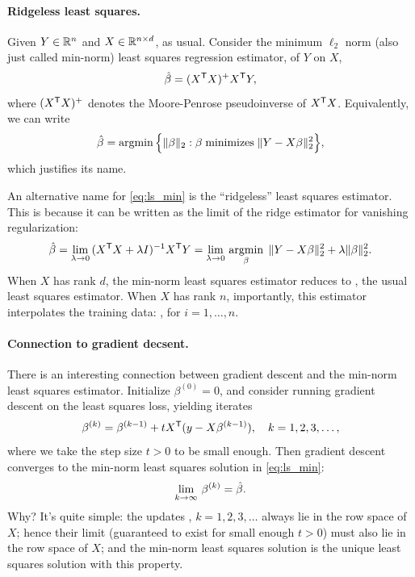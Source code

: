 \documentclass{article}
\begin{document}
\paragraph{Ridgeless least squares.}

Given $Y \in \mathbb{R}^n$ and $X \in \mathbb{R}^{n \times d}$, as usual. Consider the minimum
$\ell_2$ norm (also just called min-norm) least squares regression estimator, of
$Y$ on $X$, 
\begin{equation}
\label{eq:ls_min}
\hat{\beta} = (X^{\mathsf{T}} X)^+ X^{\mathsf{T}} Y,
\end{equation}
where $(X^{\mathsf{T}} X)^+$ denotes the Moore-Penrose pseudoinverse of $X^{\mathsf{T}} X$.
Equivalently, we can write 
\[
\hat{\beta} = \mathop{\mathrm{argmin}} \Big\{ \|\beta\|_2 : \beta \; \text{minimizes} \; \|Y - X
\beta\|_2^2 \Big\},   
\]
which justifies its name.  

An alternative name for \eqref{eq:ls_min} is the ``ridgeless'' least squares
estimator. This is because it can be written as the limit of the ridge estimator
for vanishing regularization:  
\[
\hat{\beta} = \lim_{\lambda \to 0} \, (X^{\mathsf{T}} X + \lambda I)^{-1} X^{\mathsf{T}} Y =   
\lim_{\lambda \to 0} \, \mathop{\mathrm{argmin}}_\beta \; \|Y - X\beta\|_2^2 + \lambda 
\|\beta\|_2^2.   
\]
When $X$ has rank $d$, the min-norm least squares estimator reduces to
, the usual least squares estimator.
When $X$ has rank $n$, importantly, this estimator interpolates the training
data: , for $i=1,\dots,n$.  

\paragraph{Connection to gradient decsent.}

There is an interesting connection between gradient descent and the min-norm
least squares estimator. Initialize $\beta^{(0)} = 0$, and consider running
gradient descent on the least squares loss, yielding iterates
\[
\beta^{(k)} = \beta^{(k-1)} + t X^{\mathsf{T}} (y-X\beta^{(k-1)}), 
\quad k=1,2,3,\dots,
\]
where we take the step size $t>0$ to be small enough. Then gradient descent
converges to the min-norm least squares solution in \eqref{eq:ls_min}:
\[
\lim_{k \to \infty} \, \beta^{(k)} = \hat{\beta}.
\]
Why? It's quite simple: the updates , $k=1,2,3,\dots$
always lie in the row space of $X$; hence their limit (guaranteed to exist for
small enough $t>0$) must also lie in the row space of $X$; and the min-norm
least squares solution is the unique least squares solution with this property.    
\end{document}
